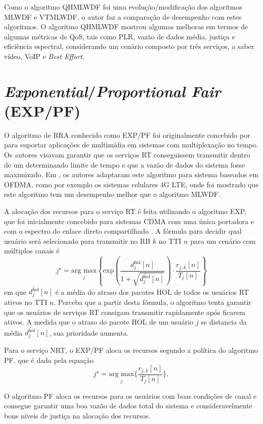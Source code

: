Como o algoritmo QHMLWDF foi uma evolução/modificação dos algoritmos MLWDF e VTMLWDF, o autor faz a comparação de desempenho com estes algoritmos. O algoritmo QHMLWDF mostrou algumas melhoras em termos de algumas métricas de QoS, tais como PLR, vazão de dados média, justiça e eficiência espectral, considerando um cenário composto por três serviços, a saber vídeo, VoIP e \textit{Best Effort}.

\section{\textit{Exponential}/\textit{Proportional Fair} (EXP/PF)}

O algoritmo de RRA conhecido como EXP/PF foi originalmente concebido por \cite{rhee2003scheduling} para suportar aplicações de multimídia em sistemas com multiplexação no tempo. Os autores visavam garantir que os serviços RT conseguissem transmitir dentro de um determinando limite de tempo e que a vazão de dados do sistema fosse maximizado. Em , os autores adaptaram este algoritmo para sistema baseados em OFDMA, como por exemplo os sistemas celulares 4G LTE, onde foi mostrado que este algoritmo tem um desempenho melhor que o algoritmo MLWDF.  

A alocação dos recursos para o serviço RT é feita utilizando o algoritmo EXP, que foi inicialmente concebido para sistemas \ac{CDMA} com uma única portadora e com o espectro do enlace direto compartilhado  \cite{shakkottai2002scheduling}. A fórmula para  decidir qual usuário será selecionado para transmitir no RB $k$ no TTI $n$ para um cenário com múltiplos canais é
%
\begin{equation}
\label{Eq:EXPPF_RT}
j^{\star} = \underset{j}{\text{arg max}}\left\{ \text{exp}\left(\dfrac{d_{j}^{\text{hol}}[n]}{1 + \sqrt{\overline{d_{j}^{\text{hol}}}[n]}}\right) \cdot \dfrac{r_{j, k}[n]}{T_{j}[n]} \right\}
\end{equation}
%
em que $\overline{d_{j}^{\text{hol}}}[n]$ é a média do atraso dos pacotes HOL de todos os usuários RT ativos no TTI $n$. Perceba que a partir desta fórmula, o algoritmo tenta garantir que os usuários de serviços RT consigam transmitir rapidamente após ficarem ativos. A medida que o atraso do pacote HOL de um usuário $j$ se distancia da média $\overline{d_{j}^{\text{hol}}}[n]$, sua prioridade aumenta.

Para o serviço NRT, o EXP/PF aloca os recursos segundo a política do algoritmo PF, que é dada pela equação
%
\begin{equation}
\label{Eq:EXPPF_NRT}
j^{\star} = \underset{j}{\text{arg max}}\Big\{\frac{r_{j, k}[n]}{T_{j}\left[n\right]} \Big \},
\end{equation}

O algoritmo PF aloca os recursos para os usuários com boas condições de canal e consegue garantir uma boa vazão de dados total do sistema e consideravelmente bons níveis de justiça na alocação dos recursos.


